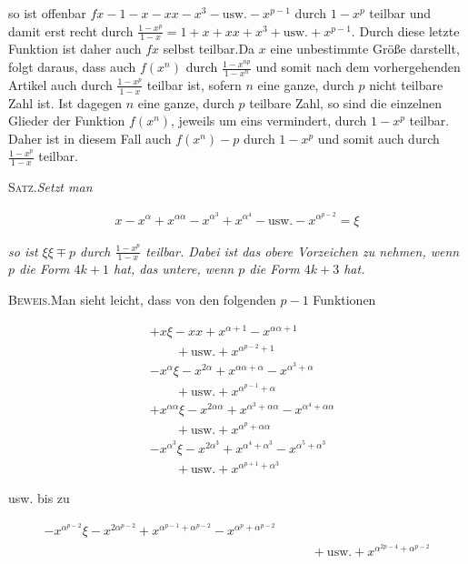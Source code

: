 so ist offenbar $fx-1- x-xx-x^3-\text{usw.}-x^{p-1}$ durch $1-x^p$ teilbar und damit erst recht durch $\frac{1-x^p}{1-x}=1+x+xx+x^3+\text{usw.}+x^{p-1}$. Durch diese letzte Funktion ist daher auch $fx$ selbst teilbar.\quad Da $x$ eine unbestimmte Größe darstellt, folgt daraus, dass auch $f(x^n)$ durch $\frac{1-x^{np}}{1-x^n}$ und somit nach dem vorhergehenden Artikel auch durch $\frac{1-x^p}{1-x}$ teilbar ist, sofern $n$ eine ganze, durch $p$ nicht teilbare Zahl ist. Ist dagegen $n$ eine ganze, durch $p$ teilbare Zahl, so sind die einzelnen Glieder der Funktion $f(x^n)$, jeweils um eins vermindert, durch $1-x^p$ teilbar. Daher ist in diesem Fall auch $f(x^n)-p$ durch $1-x^p$ und somit auch durch $\frac{1-x^p}{1-x}$ teilbar.


\textsc{Satz.}\quad \textit{Setzt man}

\[
\begin{aligned}
x-x^\alpha+x^{\alpha\alpha}-x^{\alpha^3}+x^{\alpha^4}-\text{usw.}-x^{\alpha^{p-2}}=\xi
\end{aligned}
\]

\textit{so ist $\xi\xi\mp p$ durch $\frac{1-x^p}{1-x}$ teilbar. Dabei ist das obere Vorzeichen zu nehmen, wenn $p$ die Form $4k+1$ hat, das untere, wenn $p$ die Form $4k+3$ hat.}

\textsc{Beweis.}\quad Man sieht leicht, dass von den folgenden $p-1$ Funktionen

\[
\begin{aligned}
&+x\xi-xx+x^{\alpha+1}-x^{\alpha\alpha+1}\\&\qquad+\text{usw.}+x^{\alpha^{p-2}+1}\\
&-x^\alpha\xi-x^{2\alpha}+x^{\alpha\alpha+\alpha}-x^{\alpha^3+\alpha}\\&\qquad+\text{usw.}+x^{\alpha^{p-1}+\alpha}\\
&+x^{\alpha\alpha}\xi-x^{2\alpha\alpha}+x^{\alpha^3+\alpha\alpha}-x^{\alpha^4+\alpha\alpha}\\&\qquad+\text{usw.}+x^{\alpha^p+\alpha\alpha}\\
&-x^{\alpha^3}\xi-x^{2\alpha^3}+x^{\alpha^4+\alpha^3}-x^{\alpha^5+\alpha^3}\\&\qquad+\text{usw.}+x^{\alpha^{p+1}+\alpha^3}
\end{aligned}
\]

usw. bis zu

\[
\begin{aligned}
-x^{\alpha^{p-2}}\xi-x^{2\alpha^{p-2}}+x^{\alpha^{p-1}+\alpha^{p-2}}-x^{\alpha^p+\alpha^{p-2}}\\&\qquad+\text{usw.}+x^{\alpha^{2p-4}+\alpha^{p-2}}
\end{aligned}
\]

